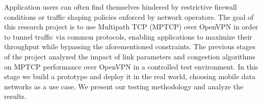 Application users can often find themselves hindered by restrictive firewall conditions or traffic shaping policies enforced by network operators. The goal of this research project is to use Multipath TCP (MPTCP) over OpenVPN in order to tunnel traffic via common protocols, enabling applications to maximize their throughput while bypassing the aforementioned constraints. The previous stages of the project analyzed the impact of link parameters and congestion algorithms on MPTCP performance over OpenVPN in a controlled test environment. In this stage we build a prototype and deploy it in the real world, choosing mobile data networks as a use case. We present our testing methodology and analyze the results.